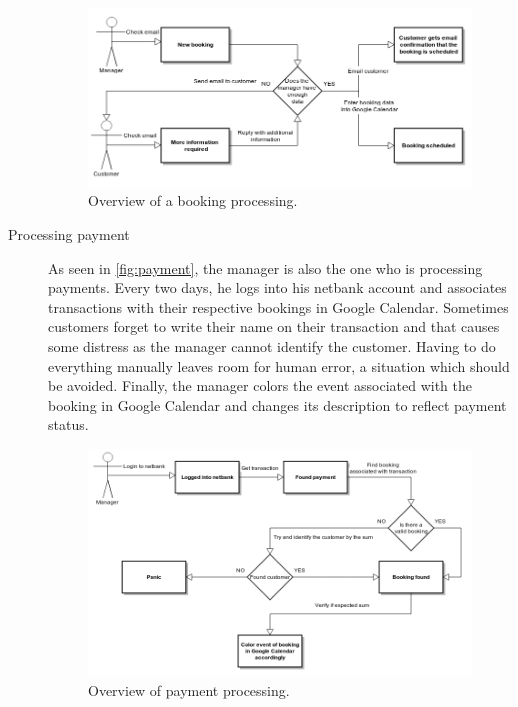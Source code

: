 \begin{description}
\begin{figure}[htbp]
    \centering
        \includegraphics[width=\textwidth]{figures/manager.png}
            \caption{Overview of a booking processing.}
        \label{fig:manager}
\end{figure}

\item[Processing payment]
As seen in \autoref{fig:payment}, the manager is also the one who is processing payments. Every two days,
he logs into his netbank account and associates transactions with their respective bookings in Google Calendar. 
Sometimes customers forget to write their name on their transaction and that causes some distress as the
manager cannot identify the customer. Having to do everything manually leaves room for human error,
a situation which should be avoided. Finally, the manager colors the event associated with the booking
in Google Calendar and changes its description to reflect payment status.

\begin{figure}[htbp]
    \centering
        \includegraphics[width=\textwidth]{figures/payment.png}
            \caption{Overview of payment processing.}
        \label{fig:payment}
\end{figure}


\end{description}
